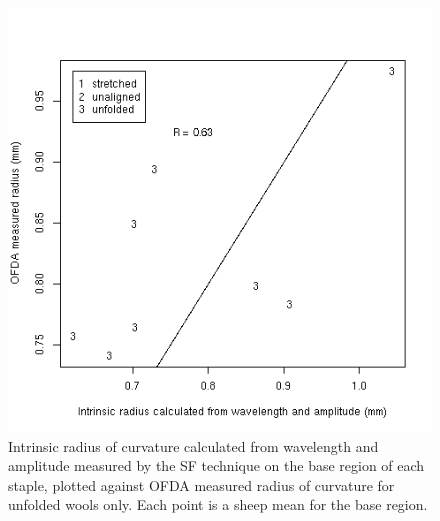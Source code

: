 %

\begin{figure}[!h]
  \centering
  \includegraphics[width=1.0\textwidth]{figwaradthetaunfoldsfbase.png}
  \caption{Intrinsic radius of curvature calculated from wavelength and amplitude measured by the SF technique on the base region of each staple, plotted against OFDA measured radius of curvature for unfolded wools only. Each point is a sheep mean for the base region.}
  \label{fig:waradthetaunfoldsfbase}
\end{figure}

%

